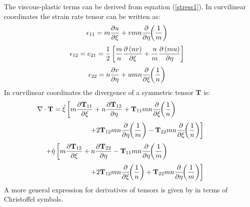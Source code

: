 The viscous-plastic terms can be derived from equation
(\ref{stress1}).  In curvilinear coordinates the strain rate tensor
can be written as:
\begin{equation}
   \epsilon_{11} = m {\partial u \over \partial \xi} +
    vmn {\partial \over \partial \eta} \!\! \left( {1 \over m} \right)
\end{equation}
\begin{equation}
   \epsilon_{12} = e_{21} = {1 \over 2} \left[
   {m \over n} {\partial \left( nv \right) \over \partial \xi}
   + {n \over m} {\partial \left( mu \right) \over \partial \eta}
   \right]
\end{equation}
\begin{equation}
   \epsilon_{22} = n {\partial v \over \partial \eta} +
    umn {\partial \over \partial \xi} \!\! \left( {1 \over n} \right)
\end{equation}
In curvilinear coordinates the divergence of a symmetric tensor {\bf T}
is:
\[
    \nabla \cdot \mbox{\bf T} =
    \hat{\xi} \left[ m
    {\partial \mbox{\bf T}_{11} \over \partial \xi}
    + n {\partial \mbox{\bf T}_{12} \over \partial \eta}
    + \mbox{\bf T}_{11} mn {\partial \over \partial \xi} \!\!
    \left( {1 \over n} \right) \right. \mbox{\hspace{2 cm}}
\]
\[
    \mbox{\hspace{2 cm}} \left. + 2 \mbox{\bf T}_{12} mn
    {\partial \over \partial \eta} \!\! \left( {1 \over m} \right)
    - \mbox{\bf T}_{22} mn
    {\partial \over \partial \xi} \!\! \left( {1 \over n} \right)
    \right]
\]
\[
    + \hat{\eta} \left[ m
    {\partial \mbox{\bf T}_{12} \over \partial \xi}
    + n {\partial \mbox{\bf T}_{22} \over \partial \eta}
    - \mbox{\bf T}_{11} mn {\partial \over \partial \eta} \!\!
    \left( {1 \over m} \right) \right. \mbox{\hspace{2 cm}}
\]
\begin{equation}
    \mbox{\hspace{2 cm}} \left. + 2 \mbox{\bf T}_{12} mn
    {\partial \over \partial \xi} \!\! \left( {1 \over n} \right)
    + \mbox{\bf T}_{22} mn
    {\partial \over \partial \eta} \!\! \left( {1 \over m} \right)
    \right]
\end{equation}
A more general expression for derivatives of tensors is given by
\citet{Aris} in terms of Christoffel symbols.

